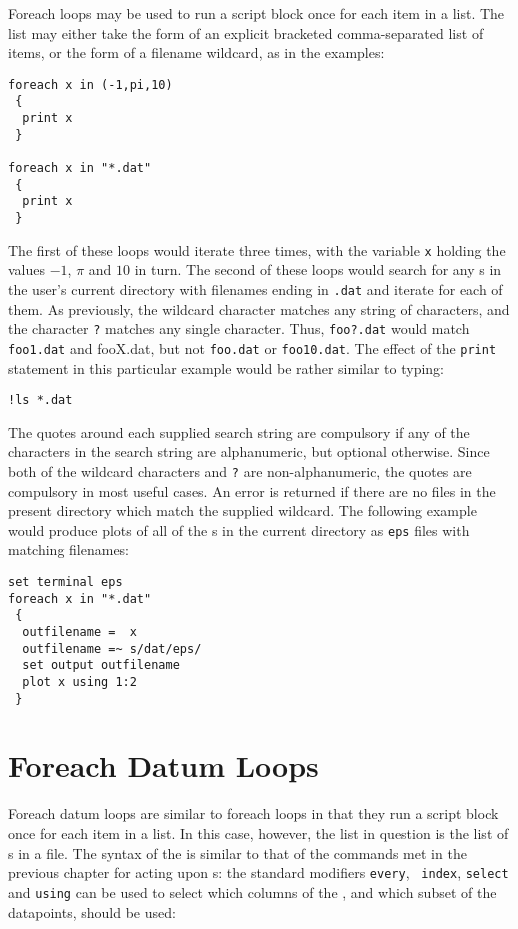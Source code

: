 Foreach loops may be used to run a script block once for each item in a list.
The list may either take the form of an explicit bracketed comma-separated list
of items, or the form of a filename wildcard, as in the examples:

\begin{verbatim}
foreach x in (-1,pi,10)
 {
  print x
 }

foreach x in "*.dat"
 {
  print x
 }
\end{verbatim}

The first of these loops would iterate three times, with the variable {\tt x}
holding the values $-1$, $\pi$ and $10$ in turn. The second of these loops
would search for any \datafile s in the user's current directory with filenames
ending in {\tt .dat} and iterate for each of them. As previously, the wildcard
character {\tt *} matches any string of characters, and the character {\tt ?}
matches any single character. Thus, {\tt foo?.dat} would match {\tt foo1.dat}
and {fooX.dat}, but not {\tt foo.dat} or {\tt foo10.dat}. The effect of the
{\tt print} statement in this particular example would be rather similar to
typing:

\begin{verbatim}
!ls *.dat
\end{verbatim}

The quotes around each supplied search string are compulsory if any of the
characters in the search string are alphanumeric, but optional otherwise. Since
both of the wildcard characters {\tt *} and {\tt ?} are non-alphanumeric, the
quotes are compulsory in most useful cases.  An error is returned if there are
no files in the present directory which match the supplied wildcard. The
following example would produce plots of all of the \datafile
s in the current directory as {\tt eps} files with matching filenames:

\begin{verbatim}
set terminal eps
foreach x in "*.dat"
 {
  outfilename =  x
  outfilename =~ s/dat/eps/
  set output outfilename
  plot x using 1:2
 }
\end{verbatim}

\section{Foreach Datum Loops}
\label{sec:foreach_datum}

Foreach datum loops are similar to foreach loops in that they run a script
block once for each item in a list.  In this case, however, the list in
question is the list of \datapoint s in a file. The syntax of the
 is similar to that of the commands met in the previous
chapter for acting upon \datafile s: the standard modifiers {\tt every}, {\tt
index}, {\tt select} and {\tt using} can be used to select which columns of the
\datafile, and which subset of the datapoints, should be used:

